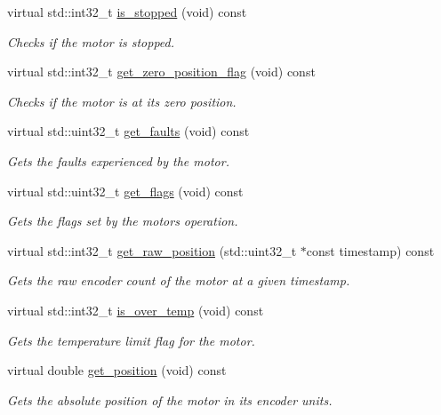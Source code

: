 \begin{DoxyCompactItemize}
virtual std\+::int32\+\_\+t \hyperlink{classpros_1_1Motor_a884c19ae71a6c9f0b316520f09769be9}{is\+\_\+stopped} (void) const
\begin{DoxyCompactList}\small\item\em Checks if the motor is stopped. \end{DoxyCompactList}\item 
virtual std\+::int32\+\_\+t \hyperlink{classpros_1_1Motor_a589a3cbb397ba065c30c1f16bb3f08a7}{get\+\_\+zero\+\_\+position\+\_\+flag} (void) const
\begin{DoxyCompactList}\small\item\em Checks if the motor is at its zero position. \end{DoxyCompactList}\item 
virtual std\+::uint32\+\_\+t \hyperlink{classpros_1_1Motor_a66c6f6420485059af301a9c8a99b2045}{get\+\_\+faults} (void) const
\begin{DoxyCompactList}\small\item\em Gets the faults experienced by the motor. \end{DoxyCompactList}\item 
virtual std\+::uint32\+\_\+t \hyperlink{classpros_1_1Motor_a7e24aa1c4363a131829e902f12e7364c}{get\+\_\+flags} (void) const
\begin{DoxyCompactList}\small\item\em Gets the flags set by the motor\textquotesingle{}s operation. \end{DoxyCompactList}\item 
virtual std\+::int32\+\_\+t \hyperlink{classpros_1_1Motor_ae82c57d590e18d7d90afec1e9cc3bb4e}{get\+\_\+raw\+\_\+position} (std\+::uint32\+\_\+t $\ast$const timestamp) const
\begin{DoxyCompactList}\small\item\em Gets the raw encoder count of the motor at a given timestamp. \end{DoxyCompactList}\item 
virtual std\+::int32\+\_\+t \hyperlink{classpros_1_1Motor_a099d50ed35d73fa29a46b2beb151ce2b}{is\+\_\+over\+\_\+temp} (void) const
\begin{DoxyCompactList}\small\item\em Gets the temperature limit flag for the motor. \end{DoxyCompactList}\item 
virtual double \hyperlink{classpros_1_1Motor_a70e725a94ec42dc7cbb3e460c36dcad3}{get\+\_\+position} (void) const
\begin{DoxyCompactList}\small\item\em Gets the absolute position of the motor in its encoder units. \end{DoxyCompactList}\item 

\end{DoxyCompactItemize}
